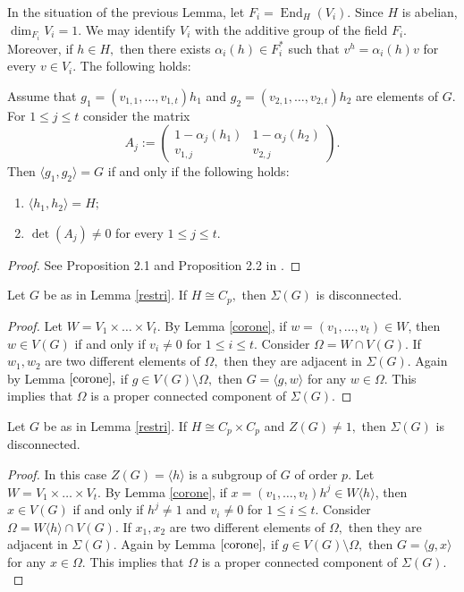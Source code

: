 \documentclass{amsart}
\DeclareMathOperator{\kndo}{End}
\numberwithin{equation}{section}
\begin{document}
In  the situation of the previous Lemma,  let $F_i=\kndo_H(V_i).$ Since $H$ is abelian, $\dim_{F_i}V_i=1$.
We may identify $V_i$ with the additive group of the field $F_i.$ Moreover, if $h \in H,$ then there exists $\alpha_i(h) \in F_i^*$ such that
$v^h=\alpha_i(h)v$ for every $v\in V_i.$ The following holds: 
\begin{lemma}\label{corone}
	Assume that $g_1=(v_{1,1},\dots,v_{1,t})h_1$ and $g_2=(v_{2,1},\dots,v_{2,t})h_2$ are elements of $G.$
For $1\leq j\leq t$ consider the matrix
	$$A_j:=\begin{pmatrix}
	1-\alpha_j(h_1)&1-\alpha_j(h_2)\\
	v_{1,j}&v_{2,j}
	\end{pmatrix}.
	$$
	Then $\langle g_1,g_2\rangle=G$ if and only if the following holds:
	\begin{enumerate}
		\item  $\langle h_1,h_2\rangle=H;$
		\item $\det(A_j)\neq 0$ for every $1\leq j\leq t.$
	\end{enumerate}
\end{lemma}
\begin{proof}
	See Proposition 2.1 and Proposition 2.2 in \cite{cliq}.
\end{proof}

\begin{lemma}
	Let $G$ be as in Lemma \ref{restri}. If $H \cong C_p,$ then $\Sigma(G)$ is disconnected.
\end{lemma}

\begin{proof}
	Let $W=V_1\times \dots \times V_t.$ By Lemma \ref{corone}, if $w=(v_1,\dots,v_t) \in W$, then $w \in V(G)$ if and only if $v_i \neq 0$ for $1\leq i \leq t.$ Consider $\Omega=W \cap V(G).$ If $w_1, w_2$ are two different elements of $\Omega,$ then they are adjacent in $\Sigma(G).$ Again by Lemma $\ref{corone},$ if $g\in V(G)\setminus \Omega,$ then $G=\langle g, w\rangle$ for any $w \in \Omega.$ This implies that
	$\Omega$ is a proper connected component of $\Sigma(G).$
\end{proof}


\begin{lemma}
	Let $G$ be as in Lemma \ref{restri}. If $H \cong C_p\times C_p$ and $Z(G)\neq 1,$ then $\Sigma(G)$ is disconnected.
\end{lemma}

\begin{proof}
In this case $Z(G)=\langle h\rangle$ is a subgroup of $G$ of order $p.$	Let $W=V_1\times \dots \times V_t.$ By Lemma \ref{corone}, if $x=(v_1,\dots,v_t)h^j \in W\langle h\rangle$, then $x \in V(G)$ if and only if $h^j\neq 1$ and $v_i \neq 0$ for $1\leq i \leq t.$ Consider $\Omega=W\langle h\rangle \cap V(G).$ If $x_1, x_2$ are two different elements of $\Omega,$ then they are adjacent in $\Sigma(G).$ Again by Lemma $\ref{corone},$ if $g\in V(G) \setminus \Omega,$ then $G=\langle g, x\rangle$ for any $x \in \Omega.$ This implies that
	$\Omega$ is a proper connected component of $\Sigma(G).$
\end{proof}
\end{document}
